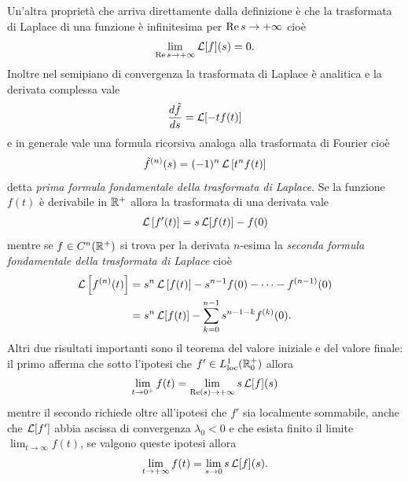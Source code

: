 Un'altra proprietà che arriva direttamente dalla definizione è che la trasformata di Laplace di una funzione è infinitesima per 
$ \textnormal{Re} \,s \to +\infty $ cioè 
\begin{align}
  \lim_{\textnormal{Re}\,s \to + \infty} \operatorname{\mathcal{L}}[f](s) = 0.
\end{align}
Inoltre nel semipiano di convergenza la trasformata di Laplace è analitica e la derivata complessa vale 
\begin{align}
  \frac{d\tilde{f}}{ds} = \operatorname{\mathcal{L}}[-tf(t)]
\end{align}
e in generale vale una formula ricorsiva analoga alla trasformata di Fourier cioè
\begin{align}
  \tilde{f}^{(n)}(s) = (-1)^n \operatorname{\mathcal{L}}\left[ t^n f(t) \right]
\end{align}
detta \textit{prima formula fondamentale della trasformata di Laplace}.
Se la funzione $ f(t) $ è derivabile in $ \mathbb{R}^+ $ allora la trasformata di una derivata vale 
\begin{align}
  \operatorname{\mathcal{L}}\left[ f'(t) \right]= s\operatorname{\mathcal{L}}[f(t)] - f(0)
\end{align}
mentre se $ f \in C^n(\mathbb{R}^+) $ si trova per la derivata $ n $-esima la \textit{seconda formula fondamentale della trasformata di Laplace} cioè 
\begin{align}
  \operatorname{\mathcal{L}}\left[ f^{(n)}(t) \right] &= s^n \operatorname{\mathcal{L}}\left[ f(t) \right] - s^{n-1} f(0) - \dots - f^{(n-1)}(0) 
  \\
  &= s^n \operatorname{\mathcal{L}}[f(t)] - \sum_{k = 0}^{n - 1} s^{n-1-k} f^{(k)}(0).
\end{align}
Altri due risultati importanti sono il teorema del valore iniziale e del valore finale: il primo afferma che sotto l'ipotesi che 
$ f'\in L^1_{\text{loc}}(\mathbb{R}^+_0) $ allora
\begin{align}
  \lim_{t\to0^+} f(t) = \lim_{\textnormal{Re}(s) \to + \infty} s \operatorname{\mathcal{L}}[f](s)
\end{align}
mentre il secondo richiede oltre all'ipotesi che $ f' $ sia localmente sommabile, anche che $ \operatorname{\mathcal{L}}[f'] $ abbia ascissa di convergenza $ \lambda_0 < 0  $
e che esista finito il limite $ \lim_{t\to \infty} f(t) $, se valgono queste ipotesi allora 
\begin{align}
  \lim_{t\to+\infty} f(t) = \lim_{s \to 0} s \operatorname{\mathcal{L}}[f](s).
\end{align}

